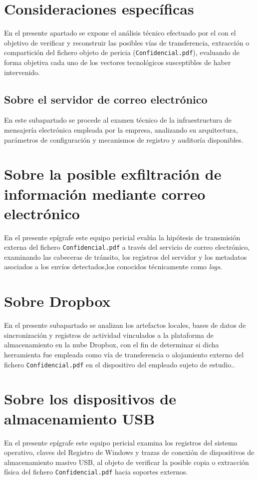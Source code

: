 \section{Consideraciones específicas}
En el presente apartado se expone el análisis técnico efectuado por el \textbf{\GrupoPracticas} con el objetivo de verificar y reconstruir las posibles vías de transferencia, extracción o compartición del fichero objeto de pericia (\texttt{Confidencial.pdf}), evaluando de forma objetiva cada uno de los vectores tecnológicos susceptibles de haber intervenido.

\subsection{Sobre el servidor de correo electrónico}
En este subapartado se procede al examen técnico de la infraestructura de mensajería electrónica empleada por la empresa, analizando su arquitectura, parámetros de configuración y mecanismos de registro y auditoría disponibles.

\newpage

\section{Sobre la posible exfiltración de información mediante correo electrónico}
En el presente epígrafe este equipo pericial evalúa la hipótesis de transmisión externa del fichero \texttt{Confidencial.pdf} a través del servicio de correo electrónico, examinando las cabeceras de tránsito, los registros del servidor y los metadatos asociados a los envíos detectados,los conocidos técnicamente como \textit{logs}.

\newpage
\section{Sobre Dropbox}
En el presente subapartado se analizan los artefactos locales, bases de datos de sincronización y registros de actividad vinculados a la plataforma de almacenamiento en la nube Dropbox, con el fin de determinar si dicha herramienta fue empleada como vía de transferencia o alojamiento externo del fichero \texttt{Confidencial.pdf} en el dispositivo del empleado sujeto de estudio..

\newpage

\section{Sobre los dispositivos de almacenamiento USB}
En el presente epígrafe este equipo pericial examina los registros del sistema operativo, claves del Registro de Windows y trazas de conexión de dispositivos de almacenamiento masivo USB, al objeto de verificar la posible copia o extracción física del fichero \texttt{Confidencial.pdf} hacia soportes externos.
